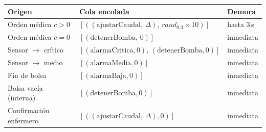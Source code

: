 \begin{table}[H]
\centering
\begin{tabular}{lll}
\toprule
Origen & Cola encolada & Demora \\
\midrule
Orden médica $c > 0$   & $[((\mathrm{ajustarCaudal},\,\Delta),\, \mathit{rand}_{0.3}\times 10)]$ & hasta 3\,s \\
Orden médica $c = 0$   & $[(\mathrm{detenerBomba},\,0)]$                                      & inmediata \\
Sensor $\to$ crítico   & $[(\mathrm{alarmaCritica},0),\,(\mathrm{detenerBomba},0)]$            & inmediata \\
Sensor $\to$ medio     & $[(\mathrm{alarmaMedia},0)]$                                         & inmediata \\
Fin de bolsa           & $[(\mathrm{alarmaBaja},0)]$                                          & inmediata \\
Bolsa vacía (interna)  & $[(\mathrm{detenerBomba},0)]$                                        & inmediata \\
Confirmación enfermero & $[((\mathrm{ajustarCaudal},\,\Delta),0)]$                             & inmediata \\
\bottomrule
\end{tabular}
\end{table}